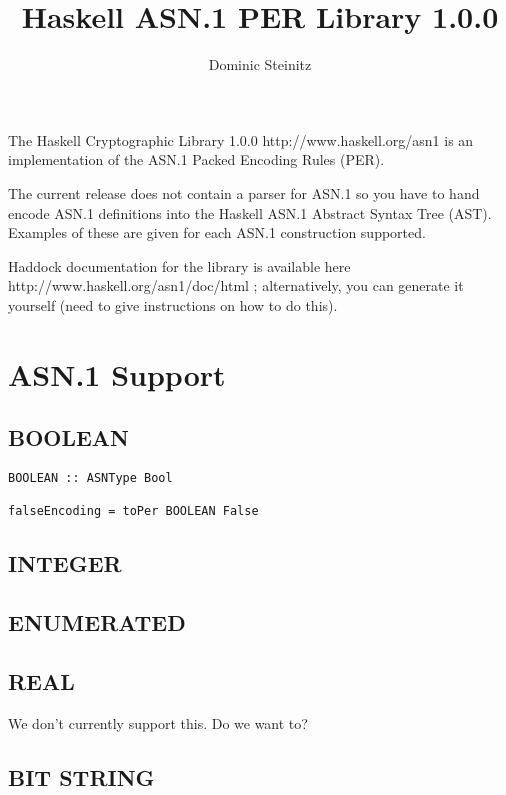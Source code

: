\documentclass{article}
\title{Haskell ASN.1 PER Library 1.0.0}
\author{Dominic Steinitz}
\begin{document}
\maketitle

The 
\htmladdnormallinkfoot
{Haskell Cryptographic Library 1.0.0}
{http://www.haskell.org/asn1}
is an implementation of the ASN.1 Packed Encoding Rules (PER).


The current release does not contain a parser for ASN.1 so you have to hand encode
ASN.1 definitions into the Haskell ASN.1 Abstract Syntax Tree (AST). Examples of these are given
for each ASN.1 construction supported.

Haddock documentation for the library is available
\htmladdnormallinkfoot
{here}
{http://www.haskell.org/asn1/doc/html}
; alternatively, you can generate it yourself (need to give instructions on how to do this).

\section{ASN.1 Support}

\subsection{BOOLEAN}

\lstset{language=Haskell}
\begin{lstlisting}[frame=single]
BOOLEAN :: ASNType Bool

falseEncoding = toPer BOOLEAN False
\end{lstlisting}

\subsection{INTEGER}

\subsection{ENUMERATED}

\subsection{REAL}

We don't currently support this. Do we want to?

\subsection{BIT STRING}
\end{document}
